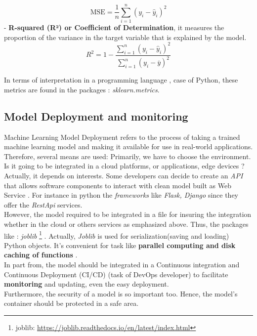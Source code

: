 \documentclass[12pt,a4paper, oneside]{book}
\begin{document}
\begin{equation}
\text{MSE} = \frac{1}{n} \sum_{i=1}^{n} (y_i - \hat{y}_i)^2
\end{equation}
- \textbf{R-squared (R²) or Coefficient of Determination}, it measures the proportion of the variance in the target variable that is explained by the model. 
\begin{equation}
	R^2 = 1 - \frac{\sum_{i=1}^{n} (y_i - \hat{y}_i)^2}{\sum_{i=1}^{n} (y_i - \bar{y})^2}
\end{equation}

In terms of interpretation in a programming language , case of Python, these metrics are found in the packages : \textit{sklearn.metrics}.\\

\subsection{Model Deployment and monitoring}
Machine Learning Model Deployment refers to the process of taking a trained machine learning model and making it available for use in real-world applications. Therefore, several means are used: Primarily, we have to choose the environment. Is it going to be integrated in a cloud platforms, or applications, edge devices ? Actually, it depends on interests. Some developers can decide to create an \textit{API} that allows software components to interact with clean model built as Web Service \cite{singh2021deploy}. For instance in python the \textit{frameworks} like \textit{Flask, Django} since they offer the \textit{RestApi} services. \\

However, the model required to be integrated in a file for insuring the integration whether in the cloud or others services as emphasized above. Thus, the packages like : \textit{joblib} \footnote{joblib: \url{https://joblib.readthedocs.io/en/latest/index.html}} . Actually, \textit{Joblib} is used for serialization(saving and loading) Python objects. It's convenient for task like \textbf{parallel computing and disk caching of functions}  \cite{faouzi2020pyts}.\\

In part from, the model should be integrated in a Continuous integration and Continuous Deployment (CI/CD) (task of DevOps developer) to facilitate \textbf{monitoring} and updating, even the easy deployment. \\

Furthermore, the security of a model is so important too. Hence, the model's container should be protected in a safe area. 
\end{document}
